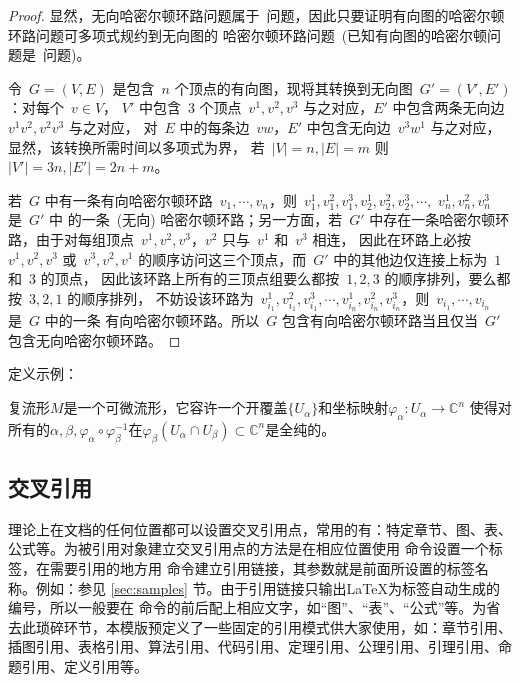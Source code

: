 \begin{proof}
    显然，无向哈密尔顿环路问题属于~\tNP 问题，因此只要证明有向图的哈密尔顿环路问题可多项式规约到无向图的
    哈密尔顿环路问题~(已知有向图的哈密尔顿问题是~\tNPC 问题)。

    令~$G=(V,E)$ 是包含~$n$ 个顶点的有向图，现将其转换到无向图~$G'=(V',E')$：对每个~$v\in V$，
    $V'$ 中包含~$3$ 个顶点~$v^1,v^2,v^3$ 与之对应，$E'$ 中包含两条无向边~$v^1v^2,v^2v^3$ 与之对应，
    对~$E$ 中的每条边~$vw$，$E'$ 中包含无向边~$v^3w^1$ 与之对应，显然，该转换所需时间以多项式为界，
    若~$|V|=n,|E|=m$ 则~$|V'|=3n,|E'|=2n+m$。

    若~$G$ 中有一条有向哈密尔顿环路~$v_1,\cdots,v_n$，则~$v_1^1,v_1^2,v_1^3,v_2^1,v_2^2,v_2^3,\cdots,$ $v_n^1,v_n^2,v_n^3$ 是~$G'$ 中
    的一条~(无向) 哈密尔顿环路；另一方面，若~$G'$ 中存在一条哈密尔顿环路，由于对每组顶点~$v^1,v^2,v^3$，$v^2$ 只与~$v^1$ 和~$v^3$ 相连，
    因此在环路上必按~$v^1,v^2,v^3$ 或~$v^3,v^2,v^1$ 的顺序访问这三个顶点，而~$G'$ 中的其他边仅连接上标为~$1$ 和~$3$ 的顶点，
    因此该环路上所有的三顶点组要么都按~$1,2,3$ 的顺序排列，要么都按~$3,2,1$ 的顺序排列，
    不妨设该环路为~$v_{i_1}^1,v_{i_1}^2,v_{i_1}^3,\cdots,v_{i_n}^1,v_{i_n}^2,v_{i_n}^3$，则~$v_{i_1},\cdots,v_{i_n}$ 是~$G$ 中的一条
    有向哈密尔顿环路。所以~$G$ 包含有向哈密尔顿环路当且仅当~$G'$ 包含无向哈密尔顿环路。\qedhere
\end{proof}

定义示例：
\begin{definition}[复流形] \label{thm:samples:d}
复流形$M$是一个可微流形，它容许一个开覆盖$\{U_{\alpha}\}$和坐标映射$\varphi_{\alpha}:U_{\alpha}\rightarrow \mathbb{C}^n$ 使得对所有的$\alpha, \beta, \varphi_{\alpha}\circ \varphi_{\beta}^{-1}$在$\varphi_{\beta}(U_{\alpha}\cap U_{\beta})\subset \mathbb{C}^n$是全纯的。
\end{definition}

\subsection{交叉引用}
理论上在文档的任何位置都可以设置交叉引用点，常用的有：特定章节、图、表、公式等。为被引用对象建立交叉引用点的方法是在相应位置使用 命令设置一个标签，在需要引用的地方用  命令建立引用链接，其参数就是前面所设置的标签名称。例如：参见 \ref{sec:samples} 节。由于引用链接只输出\LaTeX 为标签自动生成的编号，所以一般要在  命令的前后配上相应文字，如“图”、“表”、“公式”等。为省去此琐碎环节，本模版预定义了一些固定的引用模式供大家使用，如：章节引用、插图引用、表格引用、算法引用、代码引用、定理引用、公理引用、引理引用、命题引用、定义引用等。

